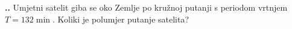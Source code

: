 


\noindent 
\textbf{
\thecjelina.\thezadatak.}
Umjetni satelit giba se oko Zemlje po kružnoj putanji s periodom vrtnjem $T=132 \min$. 
Koliki je polumjer putanje satelita?

